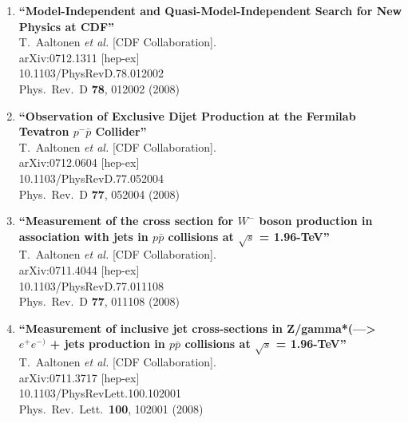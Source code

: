 \documentclass{article}
\begin{document}
\begin{enumerate}
\item%
{\bf ``Model-Independent and Quasi-Model-Independent Search for New Physics at CDF''}
  \\{}T.~Aaltonen {\it et al.}  [CDF Collaboration].
  \\{}arXiv:0712.1311 [hep-ex]
    \\{}10.1103/PhysRevD.78.012002
\\{}Phys.\ Rev.\ D {\bf 78}, 012002 (2008) %


\item%
{\bf ``Observation of Exclusive Dijet Production at the Fermilab Tevatron $p^- \bar{p}$ Collider''}
  \\{}T.~Aaltonen {\it et al.}  [CDF Collaboration].
  \\{}arXiv:0712.0604 [hep-ex]
    \\{}10.1103/PhysRevD.77.052004
\\{}Phys.\ Rev.\ D {\bf 77}, 052004 (2008) %


\item%
{\bf ``Measurement of the cross section for $W^-$ boson production in association with jets in $p\bar{p}$ collisions at $\sqrt{s}$ = 1.96-TeV''}
  \\{}T.~Aaltonen {\it et al.}  [CDF Collaboration].
  \\{}arXiv:0711.4044 [hep-ex]
    \\{}10.1103/PhysRevD.77.011108
\\{}Phys.\ Rev.\ D {\bf 77}, 011108 (2008) %


\item%
{\bf ``Measurement of inclusive jet cross-sections in Z/gamma*(---> $e^{+} e^{-)}$ + jets production in $p \bar{p}$ collisions at $\sqrt{s}$ = 1.96-TeV''}
  \\{}T.~Aaltonen {\it et al.}  [CDF Collaboration].
  \\{}arXiv:0711.3717 [hep-ex]
    \\{}10.1103/PhysRevLett.100.102001
\\{}Phys.\ Rev.\ Lett.\  {\bf 100}, 102001 (2008) %



\end{enumerate}
\end{document}
